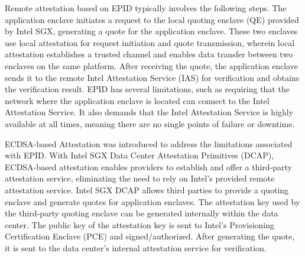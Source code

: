Remote attestation based on EPID typically involves the following steps. The application enclave initiates a request to the local quoting enclave (QE) provided by Intel SGX, generating a quote for the application enclave. These two enclaves use local attestation for request initiation and quote transmission, wherein local attestation establishes a trusted channel and enables data transfer between two enclaves on the same platform. After receiving the quote, the application enclave sends it to the remote Intel Attestation Service (IAS) for verification and obtains the verification result.
EPID has several limitations, such as requiring that the network where the application enclave is located can connect to the Intel Attestation Service. It also demands that the Intel Attestation Service is highly available at all times, meaning there are no single points of failure or downtime.

ECDSA-based Attestation was introduced to address the limitations associated with EPID. With Intel SGX Data Center Attestation Primitives (DCAP), ECDSA-based attestation enables providers to establish and offer a third-party attestation service, eliminating the need to rely on Intel's provided remote attestation service.
Intel SGX DCAP allows third parties to provide a quoting enclave and generate quotes for application enclaves. The attestation key used by the third-party quoting enclave can be generated internally within the data center. The public key of the attestation key is sent to Intel's Provisioning Certification Enclave (PCE) and signed/authorized. After generating the quote, it is sent to the data center's internal attestation service for verification.

